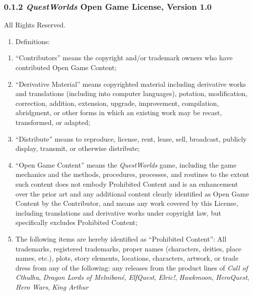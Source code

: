 \documentclass[
]{article}
\providecommand{\tightlist}{%
  \setlength{\itemsep}{0pt}\setlength{\parskip}{0pt}}
\begin{document}
\hypertarget{questworlds-open-game-license-version-1.0}{%
\subsubsection{\texorpdfstring{0.1.2 \emph{QuestWorlds} Open Game
License, Version
1.0}{0.1.2 QuestWorlds Open Game License, Version 1.0}}\label{questworlds-open-game-license-version-1.0}}

All Rights Reserved.

\begin{enumerate}
\def\labelenumi{\arabic{enumi}.}
\tightlist
\item
  Definitions:
\end{enumerate}

\begin{enumerate}
\def\labelenumi{(\alph{enumi})}
\item
  ``Contributors'' means the copyright and/or trademark owners who have
  contributed Open Game Content;
\item
  ``Derivative Material'' means copyrighted material including
  derivative works and translations (including into computer languages),
  potation, modification, correction, addition, extension, upgrade,
  improvement, compilation, abridgment, or other forms in which an
  existing work may be recast, transformed, or adapted;
\item
  ``Distribute'' means to reproduce, license, rent, lease, sell,
  broadcast, publicly display, transmit, or otherwise distribute;
\item
  ``Open Game Content'' means the \emph{QuestWorlds} game, including the
  game mechanics and the methods, procedures, processes, and routines to
  the extent such content does not embody Prohibited Content and is an
  enhancement over the prior art and any additional content clearly
  identified as Open Game Content by the Contributor, and means any work
  covered by this License, including translations and derivative works
  under copyright law, but specifically excludes Prohibited Content;
\item
  The following items are hereby identified as ``Prohibited Content'':
  All trademarks, registered trademarks, proper names (characters,
  deities, place names, etc.), plots, story elements, locations,
  characters, artwork, or trade dress from any of the following: any
  releases from the product lines of \emph{Call of Cthulhu},
  \emph{Dragon Lords of Melniboné}, \emph{ElfQuest}, \emph{Elric!},
  \emph{Hawkmoon}, \emph{HeroQuest}, \emph{Hero Wars}, \emph{King Arthur
}
\end{enumerate}
\end{document}
